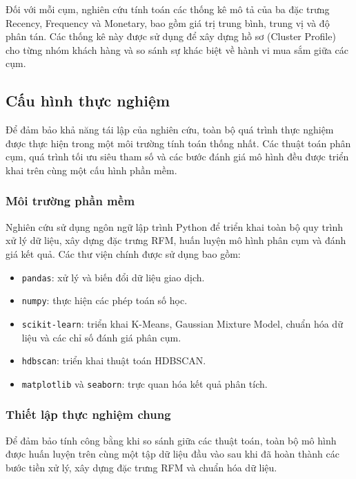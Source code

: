 \documentclass[12pt]{ai_conquer2026}
\begin{document}
Đối với mỗi cụm, nghiên cứu tính toán các thống kê mô tả của ba đặc trưng Recency, Frequency và Monetary, bao gồm giá trị trung bình, trung vị và độ phân tán. Các thống kê này được sử dụng để xây dựng hồ sơ (Cluster Profile) cho từng nhóm khách hàng và so sánh sự khác biệt về hành vi mua sắm giữa các cụm.

\subsection{Cấu hình thực nghiệm}

Để đảm bảo khả năng tái lập của nghiên cứu, toàn bộ quá trình thực nghiệm được thực hiện trong một môi trường tính toán thống nhất. Các thuật toán phân cụm, quá trình tối ưu siêu tham số và các bước đánh giá mô hình đều được triển khai trên cùng một cấu hình phần mềm.

\subsubsection{Môi trường phần mềm}

Nghiên cứu sử dụng ngôn ngữ lập trình Python để triển khai toàn bộ quy trình xử lý dữ liệu, xây dựng đặc trưng RFM, huấn luyện mô hình phân cụm và đánh giá kết quả. Các thư viện chính được sử dụng bao gồm:

\begin{itemize}
    \item \texttt{pandas}: xử lý và biến đổi dữ liệu giao dịch.
    \item \texttt{numpy}: thực hiện các phép toán số học.
    \item \texttt{scikit-learn}: triển khai K-Means, Gaussian Mixture Model, chuẩn hóa dữ liệu và các chỉ số đánh giá phân cụm.
    \item \texttt{hdbscan}: triển khai thuật toán HDBSCAN.
    \item \texttt{matplotlib} và \texttt{seaborn}: trực quan hóa kết quả phân tích.
\end{itemize}

\subsubsection{Thiết lập thực nghiệm chung}

Để đảm bảo tính công bằng khi so sánh giữa các thuật toán, toàn bộ mô hình được huấn luyện trên cùng một tập dữ liệu đầu vào sau khi đã hoàn thành các bước tiền xử lý, xây dựng đặc trưng RFM và chuẩn hóa dữ liệu.
\end{document}
